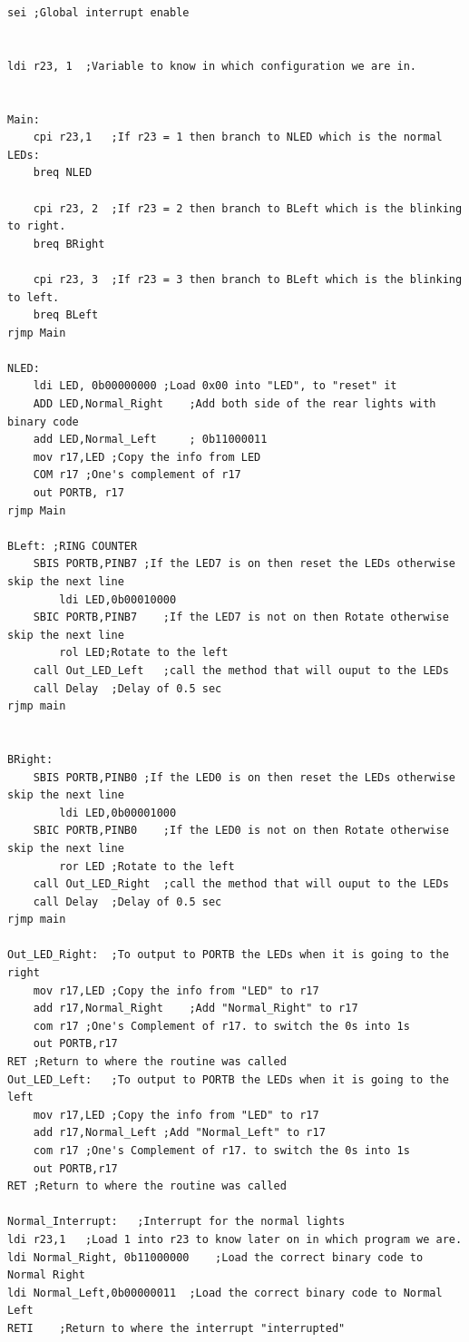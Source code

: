 \documentclass[a4paper,12pt]{article}
\begin{document}
\begin{lstlisting}
sei	;Global interrupt enable


ldi r23, 1	;Variable to know in which configuration we are in.


Main:
	cpi r23,1	;If r23 = 1 then branch to NLED which is the normal LEDs:
	breq NLED

	cpi r23, 2	;If r23 = 2 then branch to BLeft which is the blinking to right.
	breq BRight

	cpi r23, 3	;If r23 = 3 then branch to BLeft which is the blinking to left.
	breq BLeft
rjmp Main

NLED:
	ldi LED, 0b00000000	;Load 0x00 into "LED", to "reset" it
	ADD LED,Normal_Right	;Add both side of the rear lights with binary code
	add LED,Normal_Left		; 0b11000011
	mov r17,LED	;Copy the info from LED
	COM r17	;One's complement of r17
	out PORTB, r17
rjmp Main

BLeft: ;RING COUNTER
	SBIS PORTB,PINB7 ;If the LED7 is on then reset the LEDs otherwise skip the next line
		ldi LED,0b00010000
	SBIC PORTB,PINB7	;If the LED7 is not on then Rotate otherwise skip the next line 
		rol LED;Rotate to the left 
	call Out_LED_Left	;call the method that will ouput to the LEDs
	call Delay	;Delay of 0.5 sec
rjmp main


BRight:
	SBIS PORTB,PINB0 ;If the LED0 is on then reset the LEDs otherwise skip the next line
		ldi LED,0b00001000
	SBIC PORTB,PINB0	;If the LED0 is not on then Rotate otherwise skip the next line 
		ror LED	;Rotate to the left 
	call Out_LED_Right	;call the method that will ouput to the LEDs
	call Delay	;Delay of 0.5 sec
rjmp main

Out_LED_Right:	;To output to PORTB the LEDs when it is going to the right
	mov r17,LED	;Copy the info from "LED" to r17
	add r17,Normal_Right	;Add "Normal_Right" to r17
	com r17	;One's Complement of r17. to switch the 0s into 1s 
	out PORTB,r17
RET	;Return to where the routine was called
Out_LED_Left:	;To output to PORTB the LEDs when it is going to the left
	mov r17,LED	;Copy the info from "LED" to r17
	add r17,Normal_Left	;Add "Normal_Left" to r17
	com r17	;One's Complement of r17. to switch the 0s into 1s 
	out PORTB,r17
RET	;Return to where the routine was called

Normal_Interrupt:	;Interrupt for the normal lights
ldi r23,1	;Load 1 into r23 to know later on in which program we are.
ldi Normal_Right, 0b11000000	;Load the correct binary code to Normal Right
ldi Normal_Left,0b00000011	;Load the correct binary code to Normal Left
RETI	;Return to where the interrupt "interrupted"


\end{lstlisting}
\end{document}
